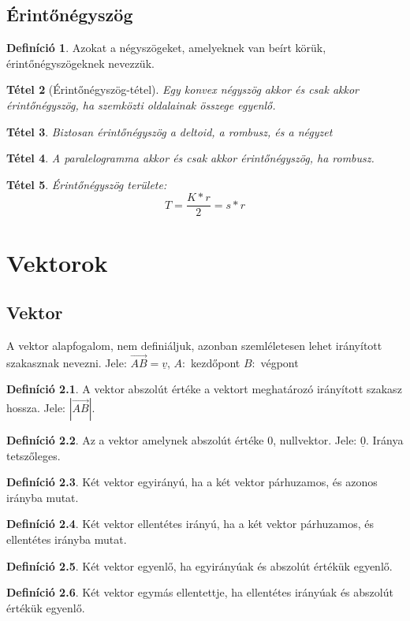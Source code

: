 \documentclass[twoside,12pt]{report}
\renewcommand{\vec}{\underline}
\newtheorem{theorem}{Tétel}[section]
\theoremstyle{definition}
\newtheorem{definition}[theorem]{Definíció}
\begin{document}
\section{Érintőnégyszög}
	\begin{definition}
		Azokat a négyszögeket, amelyeknek van beírt körük, érintőnégyszögeknek nevezzük.
	\end{definition}
	\begin{theorem}[Érintőnégyszög-tétel]
		Egy konvex négyszög akkor és csak akkor érintőnégyszög, ha szemközti oldalainak összege egyenlő.
	\end{theorem}
	\begin{theorem}
		Biztosan érintőnégyszög a deltoid, a rombusz, és a négyzet
	\end{theorem}
	\begin{theorem}
		A paralelogramma akkor és csak akkor érintőnégyszög, ha rombusz.
	\end{theorem}
	\begin{theorem}
		Érintőnégyszög területe:
		\begin{equation*}
			T=\frac{K*r}{2}=s*r
		\end{equation*}
	\end{theorem}
\chapter{Vektorok}
\section{Vektor}
	A vektor alapfogalom, nem definiáljuk, azonban szemléletesen lehet irányított szakasznak nevezni. Jele: $\overrightarrow{AB}=\vec{v}$, $A:$ kezdőpont $B:$ végpont
	\begin{definition}
		A vektor abszolút értéke a vektort meghatározó irányított szakasz hossza. Jele: $|\overrightarrow{AB}|$.
	\end{definition}
	\begin{definition}
		Az a vektor amelynek abszolút értéke 0, nullvektor. Jele: $\vec{0}$. Iránya tetszőleges.
	\end{definition}
	\begin{definition}
		Két vektor egyirányú, ha a két vektor párhuzamos, és azonos irányba mutat.
	\end{definition}
	\begin{definition}
		Két vektor ellentétes irányú, ha a két vektor párhuzamos, és ellentétes irányba mutat.
	\end{definition}
	\begin{definition}
		Két vektor egyenlő, ha egyirányúak és abszolút értékük egyenlő.
	\end{definition}
	\begin{definition}
		Két vektor egymás ellentettje, ha ellentétes irányúak és abszolút értékük egyenlő.
	\end{definition}
\end{document}
